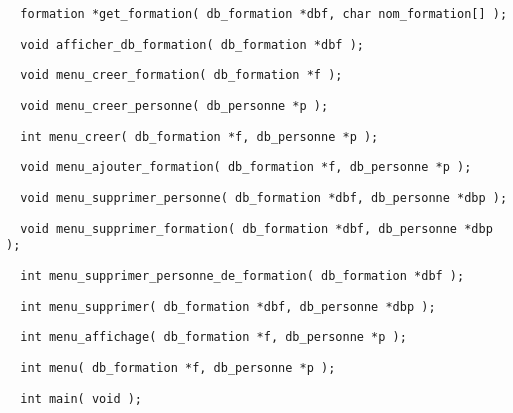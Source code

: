 \documentclass[11pt]{article}
\begin{document}
\begin{lstlisting}
  formation *get_formation( db_formation *dbf, char nom_formation[] );
\end{lstlisting}

\begin{lstlisting}
  void afficher_db_formation( db_formation *dbf );
\end{lstlisting}

\begin{lstlisting}
  void menu_creer_formation( db_formation *f );
\end{lstlisting}

\begin{lstlisting}
  void menu_creer_personne( db_personne *p );
\end{lstlisting}

\begin{lstlisting}
  int menu_creer( db_formation *f, db_personne *p );
\end{lstlisting}

\begin{lstlisting}
  void menu_ajouter_formation( db_formation *f, db_personne *p );
\end{lstlisting}

\begin{lstlisting}
  void menu_supprimer_personne( db_formation *dbf, db_personne *dbp );
\end{lstlisting}

\begin{lstlisting}
  void menu_supprimer_formation( db_formation *dbf, db_personne *dbp );
\end{lstlisting}

\begin{lstlisting}
  int menu_supprimer_personne_de_formation( db_formation *dbf );
\end{lstlisting}

\begin{lstlisting}
  int menu_supprimer( db_formation *dbf, db_personne *dbp );
\end{lstlisting}

\begin{lstlisting}
  int menu_affichage( db_formation *f, db_personne *p );
\end{lstlisting}

\begin{lstlisting}
  int menu( db_formation *f, db_personne *p );
\end{lstlisting}

\begin{lstlisting}
  int main( void );
\end{lstlisting}

\newpage
\printglossary
\end{document}

